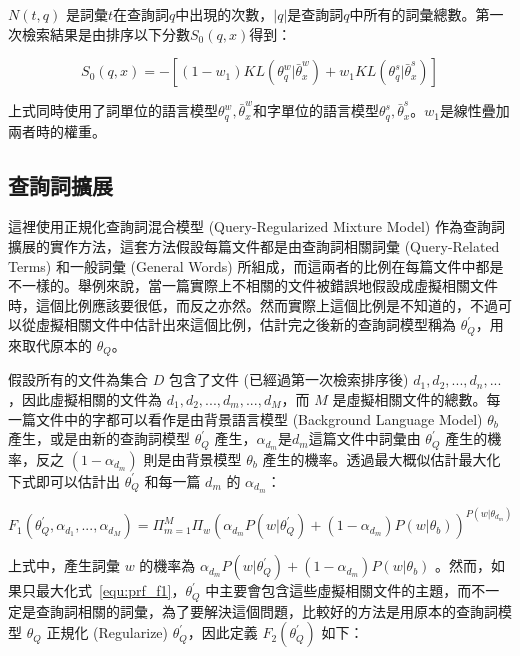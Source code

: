 $N(t, q)$ 是詞彙$t$在查詢詞$q$中出現的次數，$|q|$是查詢詞$q$中所有的詞彙總數。第一次檢索結果是由排序以下分數$S_0(q, x)$得到：

\begin{equation}
\label{equ:chap3_fpr}
S_0(q, x) = -[(1-w_1)KL(\theta_q^{w}|\bar{\theta}_x^{w}) + w_1KL(\theta_q^{s}|\bar{\theta}_x^{s})]
\end{equation}

上式同時使用了詞單位的語言模型$\theta_q^w, \bar{\theta}_x^{w}$和字單位的語言模型$\theta_q^{s}, \bar{\theta}_x^{s}$。$w_1$是線性疊加兩者時的權重。

\subsection{查詢詞擴展}
\label{sec:prf}
這裡使用正規化查詢詞混合模型 (Query-Regularized Mixture Model) 作為查詢詞擴展的實作方法，這套方法假設每篇文件都是由查詢詞相關詞彙 (Query-Related Terms) 和一般詞彙 (General Words)
所組成，而這兩者的比例在每篇文件中都是不一樣的。舉例來說，當一篇實際上不相關的文件被錯誤地假設成虛擬相關文件時，這個比例應該要很低，而反之亦然。然而實際上這個比例是不知道的，不過可以從虛擬相關文件中估計出來這個比例，估計完之後新的查詢詞模型稱為 $\theta_Q^{'}$，用來取代原本的 $\theta_Q$。

假設所有的文件為集合 $D$ 包含了文件 (已經過第一次檢索排序後) ${d_1, d_2, ..., d_n, ...}$，因此虛擬相關的文件為 ${d_1, d_2, ..., d_m, ..., d_M}$，而 $M$ 是虛擬相關文件的總數。每一篇文件中的字都可以看作是由背景語言模型 (Background Language Model) $\theta_b$ 產生，或是由新的查詢詞模型 $\theta_Q^{'}$ 產生，$\alpha_{d_m}$是$d_m$這篇文件中詞彙由 $\theta_Q^{'}$ 產生的機率，反之 $(1-\alpha_{d_m})$ 則是由背景模型 $\theta_b$ 產生的機率。透過最大概似估計最大化下式即可以估計出
$\theta_Q^{'}$ 和每一篇 $d_m$ 的 $\alpha_{d_m}$：

\begin{equation}
\label{equ:prf_f1}
F_1(\theta_Q^{'}, \alpha_{d_1}, ..., \alpha_{d_M}) = \Pi^M_{m=1} \Pi_w (\alpha_{d_m} P(w|\theta_Q^{'}) + (1 - \alpha_{d_m}) P(w|\theta_b))^{P(w|\theta_{d_m})}
\end{equation}

上式中，產生詞彙 $w$ 的機率為 $\alpha_{d_m} P(w|\theta_Q^{'}) + (1-\alpha_{d_m}) P(w|\theta_b)$ 。然而，如果只最大化式~\ref{equ:prf_f1}，$\theta_Q^{'}$ 中主要會包含這些虛擬相關文件的主題，而不一定是查詢詞相關的詞彙，為了要解決這個問題，比較好的方法是用原本的查詢詞模型 $\theta_Q$ 正規化 (Regularize) $\theta_Q^{'}$，因此定義 $F_2(\theta_Q^{'})$ 如下：

